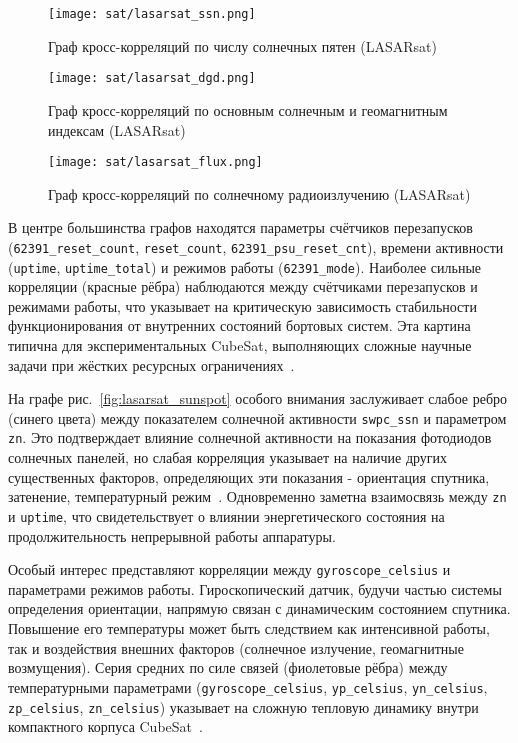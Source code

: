 \begin{figure}[H]
	\centering
	\texttt{[image: sat/lasarsat\_ssn.png]}
	\caption{Граф кросс-корреляций по числу солнечных пятен (LASARsat)}
	\label{fig:lasarsat_ssn}
\end{figure}

\begin{figure}[H]
	\centering
	\texttt{[image: sat/lasarsat\_dgd.png]}
	\caption{Граф кросс-корреляций по основным солнечным и геомагнитным индексам (LASARsat)}
	\label{fig:lasarsat_dgd}
\end{figure}

\begin{figure}[H]
	\centering
	\texttt{[image: sat/lasarsat\_flux.png]}
	\caption{Граф кросс-корреляций по солнечному радиоизлучению (LASARsat)}
	\label{fig:lasarsat_flux}
\end{figure}

В центре большинства графов находятся параметры счётчиков перезапусков
(\texttt{62391\_reset\_count}, \texttt{reset\_count},
\texttt{62391\_psu\_reset\_cnt}), времени активности (\texttt{uptime},
\texttt{uptime\_total}) и режимов работы (\texttt{62391\_mode}). Наиболее
сильные корреляции (красные рёбра) наблюдаются между счётчиками перезапусков и
режимами работы, что указывает на критическую зависимость стабильности
функционирования от внутренних состояний бортовых систем. Эта картина типична
для экспериментальных CubeSat, выполняющих сложные научные задачи при жёстких
ресурсных ограничениях~\cite{spacemanic_lasarsat, wiki_lasarsat}.

На графе рис.~\ref{fig:lasarsat_sunspot}
особого
внимания заслуживает слабое ребро (синего цвета) между показателем солнечной
активности \texttt{swpc\_ssn} и параметром \texttt{zn}. Это подтверждает влияние
солнечной активности на показания фотодиодов солнечных панелей, но слабая
корреляция указывает на наличие других существенных факторов, определяющих эти
показания - ориентация спутника, затенение, температурный
режим~\cite{lasar_info, spacemanic_lasarsat}. Одновременно заметна взаимосвязь
между \texttt{zn} и \texttt{uptime}, что свидетельствует о влиянии
энергетического состояния на продолжительность непрерывной работы аппаратуры.

Особый интерес представляют корреляции между \texttt{gyroscope\_celsius} и
параметрами режимов работы. Гироскопический датчик, будучи частью системы
определения ориентации, напрямую связан с динамическим состоянием спутника.
Повышение его температуры может быть следствием как интенсивной работы, так и
воздействия внешних факторов (солнечное излучение, геомагнитные возмущения).
Серия средних по силе связей (фиолетовые рёбра) между температурными параметрами
(\texttt{gyroscope\_celsius}, \texttt{yp\_celsius}, \texttt{yn\_celsius},
\texttt{zp\_celsius}, \texttt{zn\_celsius}) указывает на сложную тепловую
динамику внутри компактного корпуса CubeSat~\cite{wiki_lasarsat,
	spacemanic_lasarsat}.

